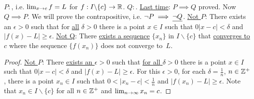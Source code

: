 \documentclass[]{article}
\begin{document}
\begin{theorem}
	[p.85] $P:$, i.e. $\lim_{x\rightarrow c} f = L$ for $f:I\backslash \{c\} \rightarrow \mathbb{R}$.
	$Q:$.
	\ul{Last time}: $P\implies Q$ proved.
	Now $Q\implies P$. We will prove the contrapositive, i.e. $\neg P\implies \underline{\neg Q}$.
	\ul{Not $P$}: There exists an $\epsilon>0$ such that for \ul{all} $\delta >0$ there is a point $x\in I$ such that $0|x-c|<\delta$ and $|f(x)-L|\geq \epsilon$.
	\ul{Not Q}: There \ul{exists a sequence} $\{x_n\}$ in \ul{$I\backslash \{c\}$} that \ul{converges to $c$} where the sequence \ul{$\{f(x_n)\}$} does not converge to~$L$.
	\label{thm3.2}
\end{theorem}
\newpage
\begin{proof}
		\ul{Not $P$}: There \ul{exists an $\epsilon>0$} such that \ul{for \ul{all} $\delta >0$} there is a point $x\in I$ such that $0|x-c|<\delta$ and $|f(x)-L|\geq \epsilon$.
		For this \ul{$\epsilon>0$}, for each $\delta=\frac{1}{n}$, $n\in\mathbb{Z}^+$, there is a point \ul{$x_n\in I$} such that $0<|x_n-c|<\frac{1}{n}$ and $|f(x_n)-L|\geq \epsilon$.
		Note that $x_n \in I \backslash \{c\}$ for all $n\in\mathbb{Z}^+$ and $\lim_{n\rightarrow\infty} x_n = c$.
\end{proof}
\end{document}
